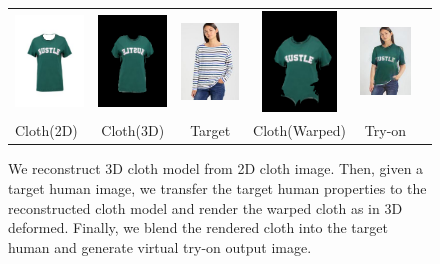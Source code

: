 \begin{figure}[t]
\begin{tabular}{lccccc}
\includegraphics[width=2cm]{figures/c2dw/000005_1.png}&
\includegraphics[width=2cm]{figures/c3drecon/000005_1_000303_0.png}&
\includegraphics[width=2cm]{figures/image/000303_0.jpg}&
\includegraphics[width=2cm]{figures/c3dwfull/000005_1_000303_0.png}&
\includegraphics[width=2cm]{figures/try-on/000005_1_000303_0.jpg}\\

  Cloth(2D)&Cloth(3D)&Target&Cloth(Warped)&Try-on\\

\end{tabular}

    \caption{We reconstruct 3D cloth model from 2D cloth image. Then, given a target human image, we transfer the target human properties to the reconstructed cloth model and render the warped cloth as in 3D deformed. Finally, we blend the rendered cloth into the target human and generate virtual try-on output image.}
    \label{fig:summary}
\end{figure}



